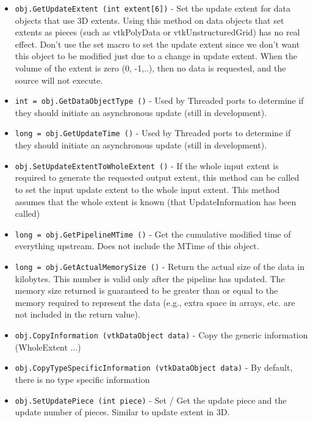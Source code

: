 \begin{itemize}
\item  \verb|obj.GetUpdateExtent (int extent[6])| -  Set the update extent for data objects that use 3D extents. Using this
 method on data objects that set extents as pieces (such as vtkPolyData or
 vtkUnstructuredGrid) has no real effect.
 Don't use the set macro to set the update extent
 since we don't want this object to be modified just due to
 a change in update extent. When the volume of the extent is zero (0, -1,..), 
 then no data is requested, and the source will not execute.

\item  \verb|int = obj.GetDataObjectType ()| -  Used by Threaded ports to determine if they should initiate an
 asynchronous update (still in development).

\item  \verb|long = obj.GetUpdateTime ()| -  Used by Threaded ports to determine if they should initiate an
 asynchronous update (still in development).

\item  \verb|obj.SetUpdateExtentToWholeExtent ()| -  If the whole input extent is required to generate the requested output
 extent, this method can be called to set the input update extent to the
 whole input extent. This method assumes that the whole extent is known
 (that UpdateInformation has been called)

\item  \verb|long = obj.GetPipelineMTime ()| -  Get the cumulative modified time of everything upstream.  Does
 not include the MTime of this object.

\item  \verb|long = obj.GetActualMemorySize ()| -  Return the actual size of the data in kilobytes. This number
 is valid only after the pipeline has updated. The memory size
 returned is guaranteed to be greater than or equal to the
 memory required to represent the data (e.g., extra space in
 arrays, etc. are not included in the return value).

\item  \verb|obj.CopyInformation (vtkDataObject data)| -  Copy the generic information (WholeExtent ...)

\item  \verb|obj.CopyTypeSpecificInformation (vtkDataObject data)| -  By default, there is no type specific information

\item  \verb|obj.SetUpdatePiece (int piece)| -  Set / Get the update piece and the update number of pieces. Similar
 to update extent in 3D.


\end{itemize}
